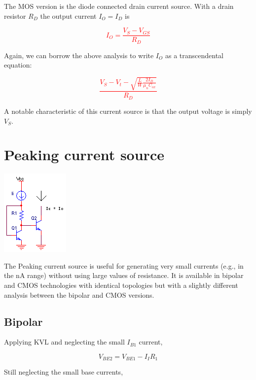 The MOS version is the diode connected drain current source. With a drain resistor $R_{D}$ the output current $I_{O} = I_{D}$ is

\textcolor{red}{
\begin{equation}
I_{O} = \frac{V_{S}-V_{GS}}{R_{D}}
\end{equation}
}

\noindent Again, we can borrow the above analysis to write $I_{O}$ as a transcendental equation:

\textcolor{red}{
\begin{equation}
\frac{V_{S}-V_{t}-\sqrt{\frac{L}{W}\frac{2I_{D}}{\mu_{n}C_{ox}}}}{R_{D}}
\end{equation}
}

A notable characteristic of this current source is that the output voltage is simply $V_{S}$.

\section{Peaking current source}
\begin{center}
	\includegraphics{schematics/peakingcurrentsource.PNG}
\end{center}
The Peaking current source is useful for generating very small currents (e.g., in the nA range) without using large values of resistance. It is available in bipolar and CMOS technologies with identical topologies but with a slightly different analysis between the bipolar and CMOS versions.

\subsection{Bipolar}
Applying KVL and neglecting the small $I_{B1}$ current,

\begin{equation}
V_{BE2} = V_{BE1} - I_{I}R_{1}
\label{eq:peaking_currentsource_KVL}
\end{equation}

\noindent Still neglecting the small base currents,

